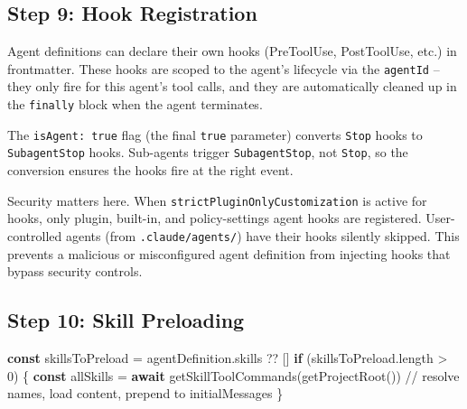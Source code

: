 \documentclass[
  english,
  11pt,
  letterpaper,
]{book}
\newenvironment{Shaded}{\begin{snugshade}}{\end{snugshade}}
\newcommand{\AttributeTok}[1]{\textcolor[rgb]{0.40,0.45,0.13}{#1}}
\newcommand{\CommentTok}[1]{\textcolor[rgb]{0.37,0.37,0.37}{#1}}
\newcommand{\ControlFlowTok}[1]{\textcolor[rgb]{0.00,0.23,0.31}{\textbf{#1}}}
\newcommand{\DecValTok}[1]{\textcolor[rgb]{0.68,0.00,0.00}{#1}}
\newcommand{\FunctionTok}[1]{\textcolor[rgb]{0.28,0.35,0.67}{#1}}
\newcommand{\KeywordTok}[1]{\textcolor[rgb]{0.00,0.23,0.31}{\textbf{#1}}}
\newcommand{\NormalTok}[1]{\textcolor[rgb]{0.00,0.23,0.31}{#1}}
\newcommand{\OperatorTok}[1]{\textcolor[rgb]{0.37,0.37,0.37}{#1}}
\newcommand{\SpecialCharTok}[1]{\textcolor[rgb]{0.37,0.37,0.37}{#1}}
\newcommand{\VerbatimStringTok}[1]{\textcolor[rgb]{0.13,0.47,0.30}{#1}}
\begin{document}
\subsection{Step 9: Hook Registration}\label{step-9-hook-registration}

\begin{Shaded}
\end{Shaded}

Agent definitions can declare their own hooks (PreToolUse, PostToolUse,
etc.) in frontmatter. These hooks are scoped to the agent's lifecycle
via the \texttt{agentId} -- they only fire for this agent's tool calls,
and they are automatically cleaned up in the \texttt{finally} block when
the agent terminates.

The \texttt{isAgent:\ true} flag (the final \texttt{true} parameter)
converts \texttt{Stop} hooks to \texttt{SubagentStop} hooks. Sub-agents
trigger \texttt{SubagentStop}, not \texttt{Stop}, so the conversion
ensures the hooks fire at the right event.

Security matters here. When \texttt{strictPluginOnlyCustomization} is
active for hooks, only plugin, built-in, and policy-settings agent hooks
are registered. User-controlled agents (from \texttt{.claude/agents/})
have their hooks silently skipped. This prevents a malicious or
misconfigured agent definition from injecting hooks that bypass security
controls.

\subsection{Step 10: Skill Preloading}\label{step-10-skill-preloading}

\begin{Shaded}
\begin{Highlighting}[]
\KeywordTok{const}\NormalTok{ skillsToPreload }\OperatorTok{=}\NormalTok{ agentDefinition}\OperatorTok{.}\AttributeTok{skills} \OperatorTok{??}\NormalTok{ []}
\ControlFlowTok{if}\NormalTok{ (skillsToPreload}\OperatorTok{.}\AttributeTok{length} \OperatorTok{\textgreater{}} \DecValTok{0}\NormalTok{) \{}
  \KeywordTok{const}\NormalTok{ allSkills }\OperatorTok{=} \ControlFlowTok{await} \FunctionTok{getSkillToolCommands}\NormalTok{(}\FunctionTok{getProjectRoot}\NormalTok{())}
  \CommentTok{// resolve names, load content, prepend to initialMessages}
\NormalTok{\}}
\end{Highlighting}
\end{Shaded}
\end{document}
